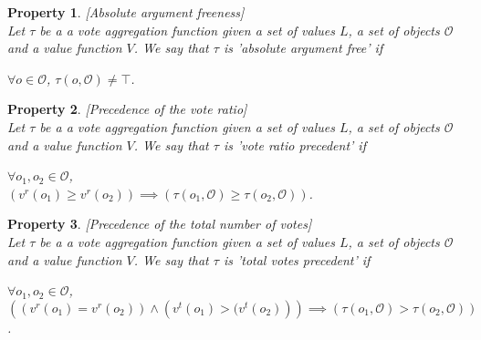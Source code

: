 \documentclass{article}
\newtheorem{property}{Property}
\newcommand{\valueset}{L}
\newcommand{\obj}{\mathcal{O}} %
\begin{document}
\begin{property}
\label{P1} [Absolute argument freeness] \\
Let $\tau$ be a a vote aggregation function given a set of values $\valueset$, a set of objects $\obj$ and a value function $V$. We say that $\tau$ is 'absolute argument free' if
\begin{center}
$\forall o \in \obj$, $\tau (o, \obj) \neq \top$.
\end{center}
\end{property}



\begin{property}
\label{P2}[Precedence of the vote ratio]\\
Let $\tau$ be a a vote aggregation function given a set of values $\valueset$, a set of objects $\obj$ and a value function $V$. We say that $\tau$ is 'vote ratio precedent' if
\begin{center}
$\forall o_1, o_2 \in \obj$,  \\
$\left( v^{r}(o_{1}) \ge v^{r}(o_{2}) \right) \implies \left( \tau(o_{1}, \obj) \ge \tau(o_{2},\obj) \right)$. \\


\end{center}

\end{property}




\begin{property}
\label{P3}[Precedence of the total number of votes] \\
Let $\tau$ be a a vote aggregation function given a set of values $\valueset$, a set of objects $\obj$ and a value function $V$. We say that $\tau$ is 'total votes precedent' if
\begin{center}
 $\forall o_1, o_2 \in \obj$,  \\
$\left( \left(v^{r}(o_{1}) = v^{r}(o_{2}) \right) \land  \left( v^{t}(o_{1}) > ( v^{t}(o_{2}) \right) \right) \implies \left( \tau(o_{1}, \obj) > \tau(o_{2}, \obj) \right)$. 
\\

\end{center}
\end{property}
\end{document}
